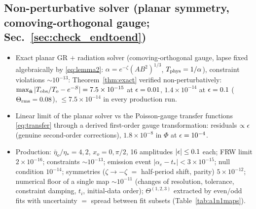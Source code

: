 \subsection*{Non-perturbative solver (planar symmetry, comoving-orthogonal gauge; Sec.~\ref{sec:check_endtoend})}
\begin{itemize}\itemsep1pt
\item[X-10] Exact planar GR $+$ radiation solver (comoving-orthogonal gauge, lapse fixed algebraically by \eqref{eq:lemma2}: $\alpha=e^{-\zeta}(AB^2)^{1/3}$, $T_{\rm phys}=1/\alpha$), constraint violations $\sim10^{-13}$: Theorem~\ref{thm:exact} verified non-perturbatively: $\max_{\hat{\mathbf n}}|T_{\rm obs}/T_o-e^{-S}|=7.5\times10^{-15}$ at $\epsilon=0.01$, $1.4\times10^{-14}$ at $\epsilon=0.1$ ($\Theta_{\rm rms}=0.08$), $\le7.5\times10^{-14}$ in every production run.
\item[NP-1] Linear limit of the planar solver vs the Poisson-gauge transfer functions \eqref{eq:transfer} through a derived first-order gauge transformation: residuals $\propto\epsilon$ (genuine second-order corrections), $1.8\times10^{-8}$ in $\Phi$ at $\epsilon=10^{-4}$.
\item[NP-2] Production: $\bar\eta_o/\eta_*=4,2$, $x_o=0,\pi/2$, 16 amplitudes $|\epsilon|\le0.1$ each; FRW limit $2\times10^{-16}$; constraints $\sim10^{-13}$; emission event $|\alpha_e-t_*|<3\times10^{-15}$; null condition $10^{-14}$; symmetries ($\zeta\to-\zeta$ $=$ half-period shift, parity) $5\times10^{-12}$; numerical floor of a single map $\sim10^{-11}$ (changes of resolution, tolerance, constraint damping, $t_i$, initial-data order); $\Theta^{(1,2,3)}$ extracted by even/odd fits with uncertainty $=$ spread between fit subsets (Table~\ref{tab:a1n1maps}).
\end{itemize}

